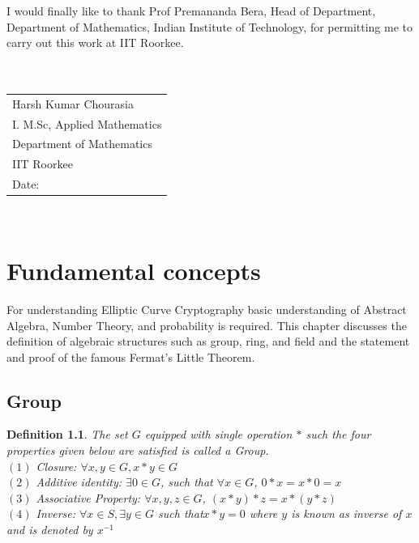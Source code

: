 \documentclass[a4paper,12pt]{report}
\newtheorem{definition}{Definition}
\begin{document}
I would finally like to thank Prof Premananda Bera, Head of Department, Department of Mathematics, Indian Institute of Technology, for permitting me to carry out this work at IIT Roorkee.\\\\\\
\begin{tabular}{l}
	Harsh Kumar Chourasia        \\
	I. M.Sc, Applied Mathematics \\
	Department of Mathematics    \\
	IIT Roorkee                  \\
	Date:                        \\
\end{tabular}

\cleardoublepage


\tableofcontents
\thispagestyle{empty}
\cleardoublepage
\
\setcounter{page}{1}

\chapter{Fundamental concepts}
\large{
	For understanding Elliptic Curve Cryptography basic understanding of Abstract Algebra, Number Theory, and probability is required. This chapter discusses the definition of algebraic structures such as group, ring, and field and the statement and proof of the famous Fermat’s Little Theorem. 
}\\
\section{Group}
\begin{definition}
	The set  $G$ equipped with single operation $*$ such the four  properties given below are satisfied is called a Group.\\
	$(1)$ Closure: $\forall x,y \in G, x*y \in G$ \\
	$(2)$ Additive identity: $\exists 0 \in G$, such that $ \forall x \in G$, $ 0*x=x*0=x$\\
	$(3)$ Associative Property: $ \forall x,y,z \in G$, $(x*y)*z=x*(y*z)$ \\
	$(4)$ Inverse: $ \forall x \in S, \exists y \in G$ such that$x*y=0$ where $y$ is known as inverse of $x$ and is denoted by $x^{-1}$
\end{definition}
\cleardoublepage
\end{document}
